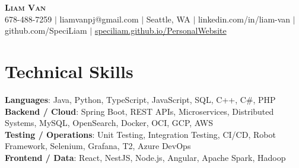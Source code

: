 \documentclass[letterpaper,11pt]{article}
\begin{document}

%
\begin{center}
    \textbf{\Huge \scshape Liam Van} \\ \vspace{1pt}
    \small 678-488-7259 $|$ \small {liamvanpj@gmail.com} $|$ Seattle, WA
 {{$|$ linkedin.com/in/liam-van} {$|$ github.com/SpeciLiam} {$|$ \href{https://speciliam.github.io/PersonalWebsite}{speciliam.github.io/PersonalWebsite}}}

\end{center}

\section{Technical Skills}
 \begin{itemize}[leftmargin=0.15in, label={}]
    \small{\item{
     \textbf{Languages}{: Java, Python, TypeScript, JavaScript, SQL, C++, C\#, PHP} \\
     \textbf{Backend / Cloud}{: Spring Boot, REST APIs, Microservices, Distributed Systems, MySQL, OpenSearch, Docker, OCI, GCP, AWS} \\
     \textbf{Testing / Operations}{: Unit Testing, Integration Testing, CI/CD, Robot Framework, Selenium, Grafana, T2, Azure DevOps} \\
     \textbf{Frontend / Data}{: React, NestJS, Node.js, Angular, Apache Spark, Hadoop} \\
    }}
 \end{itemize}
%
\end{document}
